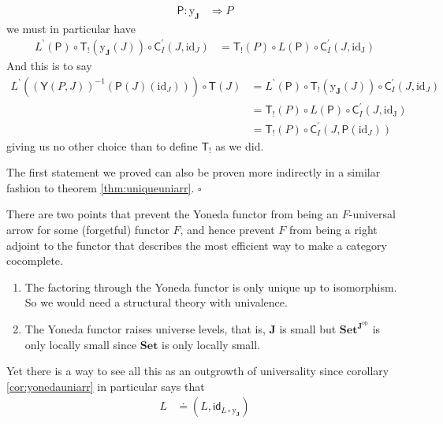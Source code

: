 \begin{prf}
\begin{description}
\begin{align*}
  \mathsf{P}
  \colon
  \mathrm{y}_{\mathbf{J}}
  &\Rightarrow
  P
\end{align*}
we must in particular have
\begin{align*}
  L^{\backprime}(\mathsf{P})
  \circ
  \mathsf{T}_{!}
  \left(
    \mathrm{y}_{\mathbf{J}}(J)
  \right)
  \circ
  \mathsf{C}_{I}^{\prime}(J,\mathrm{id}_{J})
  &=
  \mathsf{T}_{!}(P)
  \circ
  L(\mathsf{P})
  \circ
  \mathsf{C}_{I}^{\prime}(J,\mathrm{id_{J}})
\end{align*}
And this is to say
\begin{align*}
  L^{\backprime}
  \left(
    (\mathsf{Y}(P,J))^{-1}
    \left(
      \mathsf{P}(J)(\mathrm{id}_{J})
    \right)
  \right)
  \circ
  \mathsf{T}(J)
  \tag{NT}
  &=
  L^{\backprime}(\mathsf{P})
  \circ
  \mathsf{T}_{!}
  \left(
    \mathrm{y}_{\mathbf{J}}(J)
  \right)
  \circ
  \mathsf{C}_{I}^{\prime}(J,\mathrm{id}_{J})
  \\
  &=
  \mathsf{T}_{!}(P)
  \circ
  L(\mathsf{P})
  \circ
  \mathsf{C}_{I}^{\prime}(J,\mathrm{id_{J}})
  \\
  &=
  \mathsf{T}_{!}(P)
  \circ
  \mathsf{C}_{I}^{\prime}
  \left(
    J,
    \mathsf{P}(\mathrm{id}_{J})
  \right)
\end{align*}
giving us no other choice than to define $\mathsf{T}_{!}$ as we did.
\end{description}
The first statement we proved can also be proven more indirectly in a similar fashion to theorem \ref{thm:uniqueuniarr}.
\phantom{proven}
\hfill
$\square$
\end{prf}
There are two points that prevent the Yoneda functor from being an $F$-universal arrow for some (forgetful) functor $F$, and hence prevent $F$ from being a right adjoint to the functor that describes the most efficient way to make a category cocomplete.
\begin{enumerate}
\item[$\bullet$]
The factoring through the Yoneda functor is only unique up to isomorphism.
So we would need a structural theory with univalence.
\item[$\bullet$]
The Yoneda functor raises universe levels, that is, $\mathbf{J}$ is small but $\mathbf{Set}^{\mathbf{J}^{\textrm{op}}}$ is only locally small since $\mathbf{Set}$ is only locally small.
\end{enumerate}
Yet there is a way to see all this as an outgrowth of universality since corollary \ref{cor:yonedauniarr} in particular says that
\begin{align*}
  L
  &\doteq
  \left(
    L,
    \mathsf{id}_{L \circ \mathrm{y}_{\mathbf{J}}}
  \right)
\end{align*}
